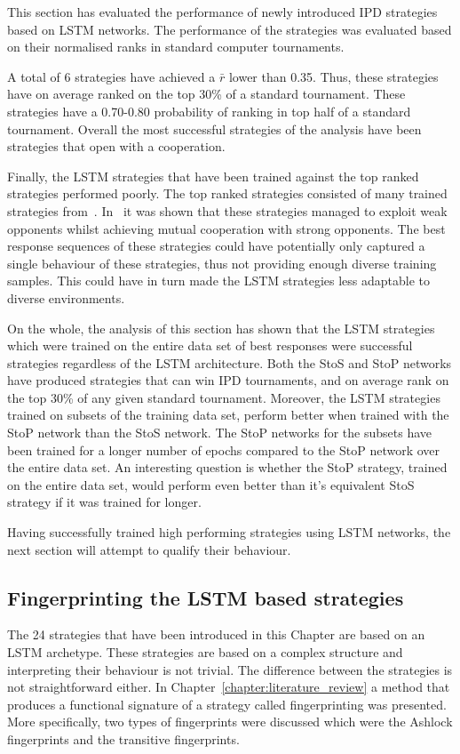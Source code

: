This section has evaluated the performance of \lstmstrategies newly introduced
IPD strategies based on LSTM networks. The performance of the strategies was
evaluated based on their normalised ranks in \metatournamentslstm standard
computer tournaments.

A total of 6 strategies have achieved a \(\bar{r}\) lower than 0.35. Thus, these
strategies have on average ranked on the top 30\% of a standard tournament.
These strategies have a 0.70-0.80 probability of ranking in top half of a
standard tournament. Overall the most successful strategies of the analysis have
been strategies that open with a cooperation.

Finally, the LSTM strategies that have been trained against the top ranked
strategies performed poorly. The top ranked strategies consisted of many trained
strategies from~\cite{Harper2017}. In~\cite{Harper2017} it was shown that these
strategies managed to exploit weak opponents whilst achieving mutual cooperation
with strong opponents. The best response sequences of these strategies could
have potentially only captured a single behaviour of these strategies, thus not
providing enough diverse training samples. This could have in turn made the LSTM
strategies less adaptable to diverse environments.

On the whole, the analysis of this section has shown that
the LSTM strategies
which were trained on the entire data set of best responses were successful
strategies regardless of the LSTM architecture. Both the StoS and StoP networks
have produced strategies that can win IPD tournaments, and on average rank on
the top 30\% of any given standard tournament. Moreover, the LSTM strategies
trained on subsets of the training data set, perform better when trained with
the StoP network than the StoS network. The StoP networks for the subsets have
been trained for a longer number of epochs compared to the StoP network over the
entire data set. An interesting question is whether the StoP strategy, trained
on the entire data set, would perform even better than it's equivalent StoS
strategy if it was trained for longer.

Having successfully trained high performing strategies using LSTM networks, 
the next section will attempt to qualify their behaviour.
\subsection{Fingerprinting the LSTM based strategies}

The 24 strategies that have been introduced in this Chapter are based on an LSTM
archetype. These strategies are based on a complex structure and interpreting
their behaviour is not trivial. The difference between the strategies is not
straightforward either. In Chapter~\ref{chapter:literature_review} a method that
produces a functional signature of a strategy called fingerprinting was
presented. More specifically, two types of fingerprints were discussed which
were the Ashlock fingerprints and the transitive fingerprints.

